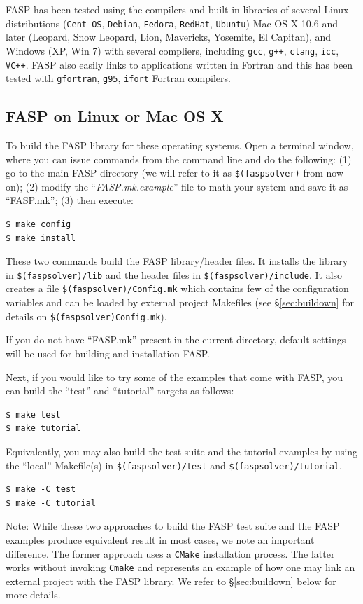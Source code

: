 \documentclass[11pt]{memoir}
\begin{document}
FASP has been tested using the compilers and built-in libraries of
several Linux distributions (\verb|Cent OS|, \verb|Debian|,
\verb|Fedora|, \verb|RedHat|, \verb|Ubuntu|) Mac OS X 10.6 and later
(Leopard, Snow Leopard, Lion, Mavericks, Yosemite, El Capitan), and
Windows (XP, Win 7) with several compliers, including \verb|gcc|,
\verb|g++|, \verb|clang|, \verb|icc|, \verb|VC++|. FASP also easily
links to applications written in Fortran and this has been tested with
\verb|gfortran|, \verb|g95|, \verb|ifort| Fortran compilers.

\subsection{FASP on Linux or Mac OS X}
To build the FASP library for these operating systems. Open a terminal
window, where you can issue commands from the command line and do the following: 
(1) go to the main FASP directory (we will refer to it as
\verb|$(faspsolver)| from now on); (2) modify the ``\emph{FASP.mk.example}''
file to math your system and save it as ``{\color{red}FASP.mk}''; (3) then execute:
%
\begin{lstlisting}[numbers=none]
$ make config 
$ make install
\end{lstlisting}
%
These two commands build the FASP library/header files. It installs
the library in \verb|$(faspsolver)/lib|
and the header files in \verb|$(faspsolver)/include|. It also creates a
file \verb|$(faspsolver)/Config.mk| which contains few of the configuration
variables and can be loaded by external project Makefiles (see
\S\ref{sec:buildown} for details on \verb|$(faspsolver)Config.mk|).

If you do not have ``FASP.mk'' present in the current directory,
default settings will be used for building and installation FASP. 

Next, if you would like to try some of the examples that come with
FASP, you can build the ``test'' and ``tutorial'' targets as follows:
%
\begin{lstlisting}[numbers=none]
$ make test
$ make tutorial
\end{lstlisting}
%
Equivalently, you may also build the test suite and the tutorial examples by using
the ``local'' Makefile(s) in \verb|$(faspsolver)/test|
and \verb|$(faspsolver)/tutorial|.
\begin{lstlisting}[numbers=none]
$ make -C test
$ make -C tutorial
\end{lstlisting}

\begin{snugshade}
  \noindent
  Note: While these two approaches to build the FASP test suite and the
  FASP examples
  produce equivalent result in most cases, we note an important
  difference. The former approach uses a
  \verb|CMake| installation process. The latter works without invoking
  \verb|Cmake| and represents an example of how one may link
  an external project with the FASP library. We refer to
  \S\ref{sec:buildown} below for more details. 
\end{snugshade}
\end{document}

